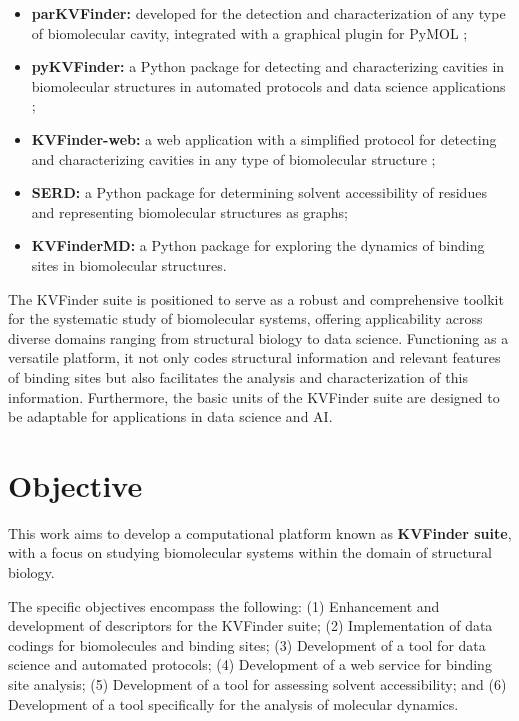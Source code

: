 \documentclass[Ingles]{phdthesis}
\begin{document}
\begin{itemize}
  \item \textbf{parKVFinder:} developed for the detection and characterization of any type of biomolecular cavity, integrated with a graphical plugin for PyMOL \cite{guerra2019,guerra2020};
  \item \textbf{pyKVFinder:} a Python package for detecting and characterizing cavities in biomolecular structures in automated protocols and data science applications \cite{guerra2021};
  \item \textbf{KVFinder-web:} a web application with a simplified protocol for detecting and characterizing cavities in any type of biomolecular structure \cite{guerra2023A};
  \item \textbf{SERD:} a Python package for determining solvent accessibility of residues and representing biomolecular structures as graphs;
  \item \textbf{KVFinderMD:} a Python package for exploring the dynamics of binding sites in biomolecular structures.
\end{itemize}

The KVFinder suite is positioned to serve as a robust and comprehensive toolkit for the systematic study of biomolecular systems, offering applicability across diverse domains ranging from structural biology to data science. Functioning as a versatile platform, it not only codes structural information and relevant features of binding sites but also facilitates the analysis and characterization of this information. Furthermore, the basic units of the KVFinder suite are designed to be adaptable for applications in data science and \acs{AI}.


\chapter{Objective}

This work aims to develop a computational platform known as \textbf{KVFinder suite}, with a focus on studying biomolecular systems within the domain of structural biology.

The specific objectives encompass the following: (1) Enhancement and development of descriptors for the KVFinder suite; (2) Implementation of data codings for biomolecules and binding sites; (3) Development of a tool for data science and automated protocols; (4) Development of a web service for binding site analysis; (5) Development of a tool for assessing solvent accessibility; and (6) Development of a tool specifically for the analysis of molecular dynamics.
\end{document}
